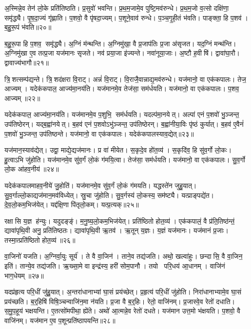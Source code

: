 अ॒स्मिन्ने॒व तेन॑ लो॒के प्रति॑तिष्ठति।
प्र॒सुवो॑ भवन्ति।
प्र॒थ॒म॒जामे॒व पुष्टि॒मव॑रुन्धे।
प्र॒थ॒म॒जो व॒त्सो दक्षि॑णा॒ समृ॑द्ध्यै।
पृ॒ष॒दा॒ज्यं गृ॑ह्णाति।
प॒शवो॒ वै पृ॑षदा॒ज्यम्।
प॒शूने॒वाव॑ रुन्धे।
प॒ञ्च॒गृ॒ही॒तं भ॑वति।
पाङ्क्ता॒ हि प॒शव॑।
ब॒हु॒रू॒पं भ॑वति॥२०॥

ब॒हु॒रू॒पा हि प॒शव॒ समृ॑द्ध्यै।
अ॒ग्निं म॑न्थन्ति।
अ॒ग्निमु॑खा॒ वै प्र॒जाप॑तिः प्र॒जा अ॑सृजत।
यद॒ग्निं मन्थ॑न्ति।
अ॒ग्निमु॑खा ए॒व तत्प्र॒जा यज॑मानः सृजते।
नव॑ प्रया॒जा इ॑ज्यन्ते।
नवा॑नूया॒जाः।
अ॒ष्टौ ह॒वीषि॑।
द्वावा॑घा॒रौ।
द्वावाज्य॑भागौ॥२१॥

त्रि॒शत्सम्प॑द्यन्ते।
त्रि॒शद॑क्षरा वि॒राट्।
अन्नं॑ वि॒राट्।
वि॒राजै॒वान्नाद्य॒मव॑रुन्धे।
यज॑मानो॒ वा एक॑कपालः।
तेज॒ आज्यम्।
यदेक॑कपाल॒ आज्य॑मा॒नय॑ति।
यज॑मानमे॒व तेज॑सा॒ सम॑र्धयति।
यज॑मानो॒ वा एक॑कपालः।
प॒शव॒ आज्यम्॥२२॥

यदेक॑कपाल॒ आज्य॑मा॒नय॑ति।
यज॑मानमे॒व प॒शुभि॒ सम॑र्धयति।
यदल्प॑मा॒नयेत्।
अल्पा॑ एनं प॒शवो॑ भु॒ञ्जन्त॒ उप॑तिष्ठेरन्।
यद्ब॒ह्वा॑नयेत्।
ब॒हव॑ एनं प॒शवोऽभु॑ञ्जन्त॒ उप॑तिष्ठेरन्।
ब॒ह्वा॑नीया॒विः पृ॑ष्ठं कुर्यात्।
ब॒हव॑ ए॒वैनं॑ प॒शवो॑ भु॒ञ्जन्त॒ उप॑तिष्ठन्ते।
यज॑मानो॒ वा एक॑कपालः।
यदेक॑कपालस्याव॒द्येत्॥२३॥

यज॑मान॒स्याव॑द्येत्।
उद्वा॒ माद्ये॒द्यज॑मानः।
प्र वा॑ मीयेत।
स॒कृदे॒व हो॑त॒व्य॑।
स॒कृदि॑व॒ हि सु॑व॒र्गो लो॒कः।
हु॒त्वाऽभि जु॑होति।
यज॑मानमे॒व सु॑व॒र्गं लो॒कं ग॑मयि॒त्वा।
तेज॑सा॒ सम॑र्धयति।
यज॑मानो॒ वा एक॑कपालः।
सु॒व॒र्गो लो॒क आ॑हव॒नीय॑॥२४॥

यदेक॑कपालमाहव॒नीये॑ जु॒होति॑।
यज॑मानमे॒व सु॑व॒र्गं लो॒कं ग॑मयति।
यद्धस्ते॑न जुहु॒यात्।
सु॒व॒र्गाल्लो॒काद्यज॑मान॒मव॑\-विध्येत्।
स्रु॒चा जु॑होति।
सु॒व॒र्गस्य॑ लो॒कस्य॒ सम॑ष्ट्यै।
यत्प्राङ्पद्ये॑त।
दे॒व॒लो॒कम॒भिज॑येत्।
यद्द॑क्षि॒णा पि॑तृलो॒कम्।
यत्प्र॒त्यक्॥२५॥

रक्षासि य॒ज्ञ ह॑न्युः।
यदुदङ्ङ्॑।
म॒नु॒ष्य॒लो॒कम॒भिज॑येत्।
प्रति॑ष्ठितो होत॒व्य॑।
एक॑कपालं॒ वै प्र॑ति॒तिष्ठ॑न्तं॒ द्यावा॑पृथि॒वी अनु॒ प्रति॑तिष्ठतः।
द्यावा॑पृथि॒वी ऋ॒तव॑।
ऋ॒तून् य॒ज्ञः।
य॒ज्ञं यज॑मानः।
यज॑मानं प्र॒जाः।
तस्मा॒त्प्रति॑ष्ठितो होत॒व्य॑॥२६॥

वा॒जिनो॑ यजति।
अ॒ग्निर्वा॒युः सूर्य॑।
ते वै वा॒जिन॑।
ताने॒व तद्य॑जति।
अथो॒ खल्वा॑हुः।
छन्दासि॒ वै वा॒जिन॒ इति॑।
तान्ये॒व तद्य॑जति।
ऋ॒ख्सा॒मे वा इन्द्र॑स्य॒ हरी॑ सोम॒पानौ।
तयो परि॒धय॑ आ॒धानम्।
वाजि॑नं भाग॒धेयम्॥२७॥

यदप्र॑हृत्य परि॒धीं जु॑हु॒यात्।
अ॒न्तरा॑धानाभ्यां घा॒सं प्रय॑च्छेत्।
प्र॒हृत्य॑ परि॒धीं जु॑होति।
निरा॑धानाभ्यामे॒व घा॒सं प्रय॑च्छति।
ब॒र्॒हिषि॑ विषि॒ञ्चन्वाजि॑न॒मा न॑यति।
प्र॒जा वै ब॒र्॒हिः।
रेतो॒ वाजि॑नम्।
प्र॒जास्वे॒व रेतो॑ दधाति।
स॒मु॒प॒हूय॑ भक्षयन्ति।
ए॒तत्सो॑मपीथा॒ ह्ये॑ते।
अथो॑ आ॒त्मन्ने॒व रेतो॑ दधते।
यज॑मान उत्त॒मो भ॑क्षयति।
प॒शवो॒ वै वाजि॑नम्।
यज॑मान ए॒व प॒शून्प्रति॑ष्ठापयन्ति॥२८॥\anuvakamend[लो॒को ब॑हुरू॒पं भ॑व॒त्याज्य॑भागौ प॒शव॒ आज्य॑मव॒द्येदा॑हव॒नीय॑ प्र॒त्यक्तस्मा॒त्प्रति॑ष्ठितो होत॒व्यो॑ भाग॒धेय॑मे॒ते च॒त्वारि॑ च]


